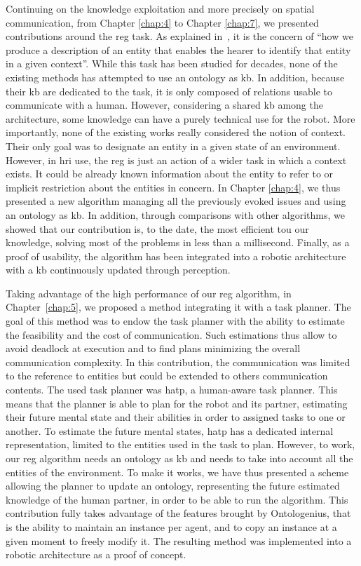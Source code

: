 Continuing on the knowledge exploitation and more precisely on spatial communication, from Chapter \ref{chap:4} to Chapter \ref{chap:7}, we presented contributions around the \acrfull{reg} task. As explained in~\cite{reiter_2000_building}, it is the concern of ``how we produce a description of an entity that enables the hearer to identify that entity in a given context''. While this task has been studied for decades, none of the existing methods has attempted to use an ontology as \acrshort{kb}. In addition, because their \acrshort{kb} are dedicated to the task, it is only composed of relations usable to communicate with a human. However, considering a shared \acrshort{kb} among the architecture, some knowledge can have a purely technical use for the robot. More importantly, none of the existing works really considered the notion of context. Their only goal was to designate an entity in a given state of an environment. However, in \acrshort{hri} use, the \acrshort{reg} is just an action of a wider task in which a context exists. It could be already known information about the entity to refer to or implicit restriction about the entities in concern. In Chapter \ref{chap:4}, we thus presented a new algorithm managing all the previously evoked issues and using an ontology as \acrshort{kb}. In addition, through comparisons with other algorithms, we showed that our contribution is, to the date, the most efficient tou our knowledge, solving most of the problems in less than a millisecond. Finally, as a proof of usability, the algorithm has been integrated into a robotic architecture with a \acrshort{kb} continuously updated through perception.

Taking advantage of the high performance of our \acrshort{reg} algorithm, in Chapter~\ref{chap:5}, we proposed a method integrating it with a task planner. The goal of this method was to endow the task planner with the ability to estimate the feasibility and the cost of communication. Such estimations thus allow to avoid deadlock at execution and to find plans minimizing the overall communication complexity. In this contribution, the communication was limited to the reference to entities but could be extended to others communication contents. The used task planner was \acrshort{hatp}, a human-aware task planner. This means that the planner is able to plan for the robot and its partner, estimating their future mental state and their abilities in order to assigned tasks to one or another. To estimate the future mental states, \acrshort{hatp} has a dedicated internal representation, limited to the entities used in the task to plan. However, to work, our \acrshort{reg} algorithm needs an ontology as \acrshort{kb} and needs to take into account all the entities of the environment. To make it works, we have thus presented a scheme allowing the planner to update an ontology, representing the future estimated knowledge of the human partner, in order to be able to run the algorithm. This contribution fully takes advantage of the features brought by Ontologenius, that is the ability to maintain an instance per agent, and to copy an instance at a given moment to freely modify it. The resulting method was implemented into a robotic architecture as a proof of concept.

